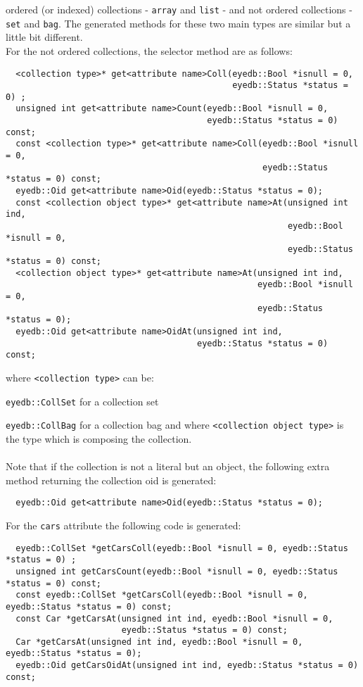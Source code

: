 ordered (or indexed) collections - \texttt{array} and \texttt{list} - and not
ordered collections - \texttt{set} and \texttt{bag}.
The generated methods for these two main types are similar but a
little bit different.
\\
For the not ordered collections, the selector method are as follows:
\verbsize
\begin{verbatim}
  <collection type>* get<attribute name>Coll(eyedb::Bool *isnull = 0,
                                             eyedb::Status *status = 0) ;
  unsigned int get<attribute name>Count(eyedb::Bool *isnull = 0,
                                        eyedb::Status *status = 0) const;
  const <collection type>* get<attribute name>Coll(eyedb::Bool *isnull = 0,
                                                   eyedb::Status *status = 0) const;
  eyedb::Oid get<attribute name>Oid(eyedb::Status *status = 0);
  const <collection object type>* get<attribute name>At(unsigned int ind,
                                                        eyedb::Bool *isnull = 0,
                                                        eyedb::Status *status = 0) const;
  <collection object type>* get<attribute name>At(unsigned int ind,
                                                  eyedb::Bool *isnull = 0,
                                                  eyedb::Status *status = 0);
  eyedb::Oid get<attribute name>OidAt(unsigned int ind,
                                      eyedb::Status *status = 0) const;
\end{verbatim}
\normalsize
where \texttt{<collection type>} can be:
\be
\item \texttt{eyedb::CollSet} for a collection set
\item \texttt{eyedb::CollBag} for a collection bag
\ee
and where \texttt{<collection object type>} is the type which is composing
the collection.
\\
\\
Note that if the collection is not a literal but an object, the following
extra method returning the collection oid is generated:
\verbsize
\begin{verbatim}
  eyedb::Oid get<attribute name>Oid(eyedb::Status *status = 0);
\end{verbatim}
\normalsize
For the \texttt{cars} attribute the following code is generated:
\verbsize
\begin{verbatim}
  eyedb::CollSet *getCarsColl(eyedb::Bool *isnull = 0, eyedb::Status *status = 0) ;
  unsigned int getCarsCount(eyedb::Bool *isnull = 0, eyedb::Status *status = 0) const;
  const eyedb::CollSet *getCarsColl(eyedb::Bool *isnull = 0, eyedb::Status *status = 0) const;
  const Car *getCarsAt(unsigned int ind, eyedb::Bool *isnull = 0,
                       eyedb::Status *status = 0) const;
  Car *getCarsAt(unsigned int ind, eyedb::Bool *isnull = 0, eyedb::Status *status = 0);
  eyedb::Oid getCarsOidAt(unsigned int ind, eyedb::Status *status = 0) const;
\end{verbatim}
